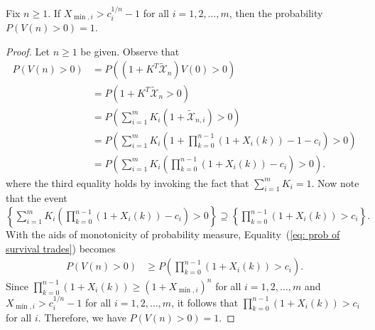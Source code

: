 \documentclass[10pt,a4paper]{amsart}
\begin{document}
	\begin{lemma} \label{lemma: survival trades under costs}
		Fix $n \geq 1.$
		If ${X}_{\min,i} > c_i^{1/n}-1$ for all $i=1,2,\dots,m$, then the probability $P( V(n) > 0) =1.$
	\end{lemma}

	\begin{proof} 
		Let $n\geq 1$ be given.
		Observe that
		\begin{align}
			P(V(n) > 0)  
			&=  P( (1+K^T \widetilde{\mathcal{X}}_n)V(0)>0) \nonumber \\
			&=  P( 1+K^T \widetilde{\mathcal{X}}_n>0) \nonumber \\
			&=  P\left( \sum_{i=1}^m K_i( 1+  \widetilde{\mathcal{X}}_{n,i}) >0 \right)\nonumber \\
			&=  P\left( \sum_{i=1}^m K_i\left( 1+  \prod_{k=0}^{n-1} (1+ X_i(k))  - 1 - c_i \right) >0 \right)\nonumber \\
			&=  P\left( \sum_{i=1}^m K_i\left(   \prod_{k=0}^{n-1} (1+ X_i(k))  - c_i \right) >0 \right).  \label{eq: prob of survival trades}
		\end{align}
		where the third equality holds by invoking the fact that $\sum_{i=1}^m K_i = 1.$
		Now note that the event
		$
		\left\{ \sum_{i=1}^m K_i\left(   \prod_{k=0}^{n-1} (1+ X_i(k))  - c_i  \right) >0 \right\} \supseteq \left\{  \prod_{k=0}^{n-1} (1+ X_i(k))  >  c_i  \right\}.
		$
		With the aids of monotonicity of probability measure,  Equality~(\ref{eq: prob of survival trades}) becomes
		\begin{align*}
			P(V(n) > 0)  
			&\geq P\left( \prod_{k=0}^{n-1} (1+ X_i(k))  > c_i   \right).
		\end{align*}
		Since $\prod_{k=0}^{n-1} (1+X_i(k)) \geq (1+X_{\min,i})^n$ for all $i=1,2,\dots,m$ and ${X}_{\min,i} > c_i^{1/n}-1$ for all $i=1,2,\dots,m$, it follows that
		$
		\prod_{k=0}^{n-1} (1+X_i(k)) > c_i
		$ for all $i$.
		Therefore, we have
		$
		P(V(n)>0) = 1.
		$
	\end{proof}
\end{document}
